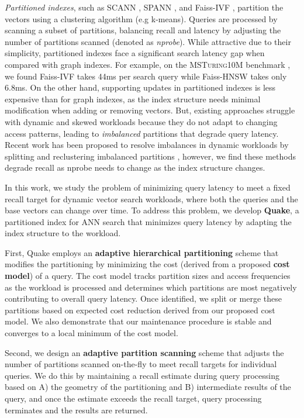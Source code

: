 \emph{Partitioned indexes}, such as SCANN \cite{guo_accelerating_2020, soar_2023}, SPANN \cite{xu_spfresh_2023, chen_spann_nodate}, and  Faiss-IVF \cite{douze2024faisslibrary}, partition the vectors using a clustering algorithm (e.g k-means). Queries are processed by scanning a subset of partitions, balancing recall and latency by adjusting the number of partitions scanned (denoted as \emph{nprobe}).  While attractive due to their simplicity, partitioned indexes face a significant search latency gap when compared with graph indexes. For example, on the \textsc{MSTuring10M} benchmark \cite{bigann}, we found Faiss-IVF takes 44ms per search query while Faiss-HNSW takes only 6.8ms. 
On the other hand, supporting updates in partitioned indexes is less expensive than for graph indexes, as the index structure needs minimal modification when adding or removing vectors. But, existing approaches struggle with dynamic and skewed workloads because they do not adapt to changing access patterns, leading to \emph{imbalanced} partitions that degrade query latency. Recent work has been proposed to resolve imbalances in dynamic workloads by splitting and reclustering imbalanced partitions \cite{xu_spfresh_2023, baranchuk_dedrift_2023}, however, we find these methods degrade recall as nprobe needs to change as the index structure changes.

In this work, we study the problem of minimizing query latency to meet a fixed recall target for dynamic vector search workloads, where both the queries and the base vectors can change over time. To address this problem, we develop \textbf{Quake}, a partitioned index for ANN search that minimizes query latency by adapting the index structure to the workload. 


First, Quake employs an \textbf{adaptive hierarchical partitioning} scheme that modifies the partitioning by minimizing the cost (derived from a proposed \textbf{cost model}) of a query. The cost model tracks partition sizes and access frequencies as the workload is processed and determines which partitions are most negatively contributing to overall query latency. Once identified, we split or merge these partitions based on expected cost reduction derived from our proposed cost model. We also demonstrate that our maintenance procedure is stable and converges to a local minimum of the cost model.

Second, we design an \textbf{adaptive partition scanning} scheme that adjusts the number of partitions scanned on-the-fly to meet recall targets for individual queries. We do this by maintaining a recall estimate during query processing based on A) the geometry of the partitioning and B) intermediate results of the query, and once the estimate exceeds the recall target, query processing terminates and the results are returned.

